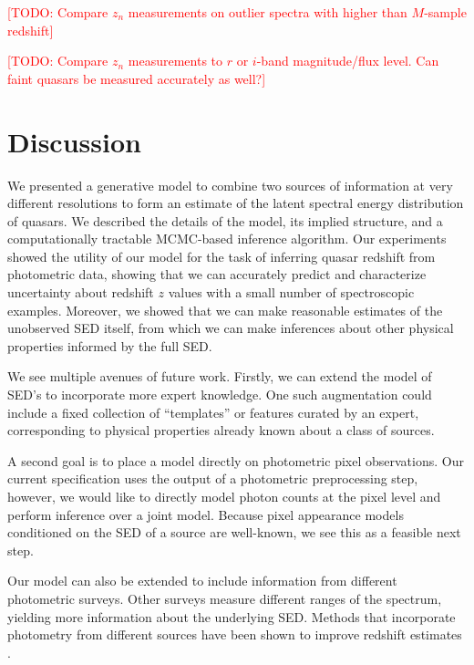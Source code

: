 \documentclass{article}
\newcommand{\red}[1]{\textcolor{red}{[TODO: #1]}}
\begin{document}
\red{Compare $z_n$ measurements on outlier spectra with higher than $M$-sample redshift}

\red{Compare $z_n$ measurements to $r$ or $i$-band magnitude/flux level.  Can faint quasars be measured accurately as well?}

\section{Discussion}
We presented a generative model to combine two sources of information at very different resolutions to form an estimate of the latent spectral energy distribution of quasars.  We described the details of the model, its implied structure, and a computationally tractable MCMC-based inference algorithm. 
Our experiments showed the utility of our model for the task of inferring quasar redshift from photometric data, showing that we can accurately predict and characterize uncertainty about redshift $z$ values with a small number of spectroscopic examples.  
Moreover, we showed that we can make reasonable estimates of the unobserved SED itself, from which we can make inferences about other physical properties informed by the full SED.  
 
We see multiple avenues of future work.  Firstly, we can extend the model of SED's to incorporate more expert knowledge.  One such augmentation could include a fixed collection of ``templates'' or features curated by an expert, corresponding to physical properties already known about a class of sources.  

A second goal is to place a model directly on photometric pixel observations.  Our current specification uses the output of a photometric preprocessing step, however, we would like to directly model photon counts at the pixel level and perform inference over a joint model. 
Because pixel appearance models conditioned on the SED of a source are well-known, we see this as a feasible next step. 

Our model can also be extended to include information from different photometric surveys.  Other surveys measure different ranges of the spectrum, yielding more information about the underlying SED.  Methods that incorporate photometry from different sources have been shown to improve redshift estimates \cite{brescia2013photometric}.  
\end{document}
